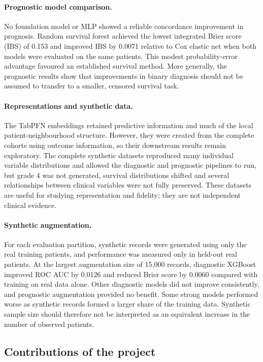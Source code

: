 \paragraph{Prognostic model comparison.}
No foundation model or MLP showed a reliable concordance improvement in
prognosis. Random survival forest achieved the lowest integrated Brier score
(IBS) of 0.153 and improved IBS by 0.0071 relative to Cox elastic net when both
models were evaluated on the same patients. This modest probability-error
advantage favoured an established survival method. More generally, the
prognostic results show that improvements in binary diagnosis should not be
assumed to transfer to a smaller, censored survival task.

\paragraph{Representations and synthetic data.}
The TabPFN embeddings retained predictive information and much of the local
patient-neighbourhood structure. However, they were created from the complete
cohorts using outcome information, so their downstream results remain
exploratory. The complete synthetic datasets reproduced many individual
variable distributions and allowed the diagnostic and prognostic pipelines to
run, but grade 4 was not generated, survival distributions shifted and several
relationships between clinical variables were not fully preserved. These
datasets are useful for studying representation and fidelity; they are not
independent clinical evidence.

\paragraph{Synthetic augmentation.}
For each evaluation partition, synthetic records were generated using only the
real training patients, and performance was measured only in held-out real
patients. At the largest augmentation size of 15,000 records, diagnostic
XGBoost improved ROC AUC by 0.0126 and reduced Brier score by 0.0060 compared
with training on real data alone. Other diagnostic models did not improve
consistently, and prognostic augmentation provided no benefit. Some strong
models performed worse as synthetic records formed a larger share of the
training data. Synthetic sample size should therefore not be interpreted as an
equivalent increase in the number of observed patients.

\subsection{Contributions of the project}

